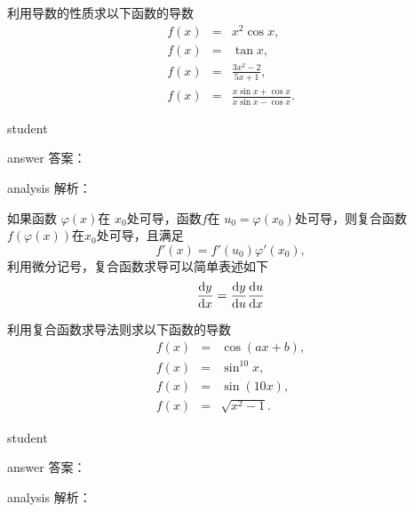 \begin{example}
	利用导数的性质求以下函数的导数
	\begin{eqnarray*}
	f(x)&=& x^2\cos x,\\
	f(x)&=& \tan x,\\
	f(x)&=&\frac{3x^2-2}{5x+1},\\
	f(x)&=& \frac{x\sin x+\cos x}{x\sin x-\cos x}.
				\end{eqnarray*}
	
	\begin{taggedblock}{student}
		\vspace*{0cm}
	\end{taggedblock}
	
	
	\begin{taggedblock}{answer}
		答案：
	\end{taggedblock}
	
	
	\begin{taggedblock}{analysis}
		解析：
	\end{taggedblock}
\end{example}

如果函数 $ \varphi(x) $在 $ x_0 $处可导，函数$  f $在 $ u_0=\varphi(x_0) $处可导，则复合函数$  f(\varphi(x)) $在$  x_0 $处可导，且满足
\begin{equation}
f' (x)=f' (u_0)φ' (x_0),
\end{equation}
利用微分记号，复合函数求导可以简单表述如下
\begin{equation}
\dv{y}{x} = \dv{y}{u}\dv{u}{x}
\end{equation}

\begin{example}
	利用复合函数求导法则求以下函数的导数
	\begin{eqnarray*}
		f(x)&=&\cos(ax+b),\\
		f(x)&=&\sin^{10}x,\\
		f(x)&=&\sin(10 x),\\
		f(x)&=&\sqrt{x^2-1}.
	\end{eqnarray*}
	
	\begin{taggedblock}{student}
		\vspace*{0cm}
	\end{taggedblock}
	
	
	\begin{taggedblock}{answer}
		答案：
	\end{taggedblock}
	
	
	\begin{taggedblock}{analysis}
		解析：
	\end{taggedblock}
\end{example}


